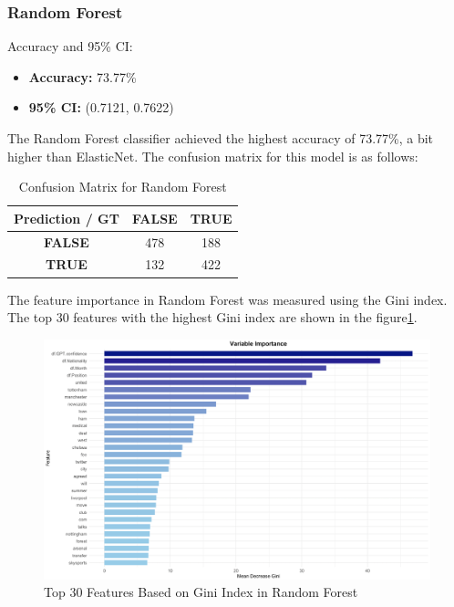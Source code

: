 \subsubsection{Random Forest}

Accuracy and 95\% CI:

\begin{itemize}
    \item \textbf{Accuracy:} 73.77\%
    \item \textbf{95\% CI:} (0.7121, 0.7622)
\end{itemize}

The Random Forest classifier achieved the highest accuracy of 73.77\%, a bit higher than ElasticNet. The confusion matrix for this model is as follows:

\begin{table}[ht]
    \centering
    \begin{tabular}{|c|c|c|}
    \hline
    \textbf{Prediction / GT} & \textbf{FALSE} & \textbf{TRUE} \\
    \hline
    \textbf{FALSE} & \cellcolor{red!65} 478 & \cellcolor{cyan!60} 188 \\
    \hline
    \textbf{TRUE} & \cellcolor{cyan!40} 132 & \cellcolor{red!50} 422 \\
    \hline
    \end{tabular}
    \caption{Confusion Matrix for Random Forest}
    \label{tab:rf_cm}
\end{table}

The feature importance in Random Forest was measured using the Gini index. The top 30 features with the highest Gini index are shown in the figure\ref{fig:rf_gini}.
     
\begin{figure}[ht]
    \centering
    \includegraphics[width=.95\textwidth]{figs/rf_gini.png}
    \caption{Top 30 Features Based on Gini Index in Random Forest}
    \label{fig:rf_gini}
\end{figure}
